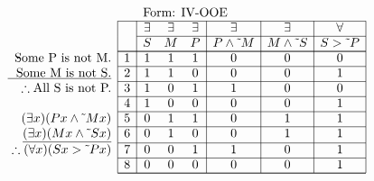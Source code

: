 \documentclass[10pt,legalpaper,landscape,cmtt]{article}
\begin{document}
{\begin{minipage}[t]{3.25in}
	\(
	\begin{array}{r|c|ccc|c|c|c|}
		\multicolumn{2}{c}{}&\multicolumn{6}{l}{\mbox{Form: IV-OOE}} \\ \cline{2-8}
		\hspace{1in}	&	& \exists & \exists & \exists & \exists & \exists & \forall\\ \cline{3-8}
		&	& S & M & P &  P \wedge \tilde~M  &  M \wedge \tilde~S  &  S > \tilde~P \\ \cline{2-8} \cline{2-8}
		\phantom{\therefore}\mbox{Some P is not M.}   & 1 & 1 & 1 & 1 &   0   &   0   &   0  \\ \cline{2-8}
		\underline{\phantom{\therefore}\mbox{Some M is not S.}}   & 2 & 1 & 1 & 0 &   0   &   0   &   1  \\ \cline{2-8}
		\therefore \mbox{All S is not P.}   & 3 & 1 & 0 & 1 &   1   &   0   &   0  \\ \cline{2-8}
		& 4 & 1 & 0 & 0 &   0   &   0   &   1  \\ \cline{2-8}
		(\exists x)(Px \wedge \tilde~Mx)   & 5 & 0 & 1 & 1 &   0   &   1   &   1  \\ \cline{2-8}
		\underline{(\exists x)(Mx \wedge \tilde~Sx)}   & 6 & 0 & 1 & 0 &   0   &   1   &   1  \\ \cline{2-8}
		\therefore(\forall x)(Sx > \tilde~Px)   & 7 & 0 & 0 & 1 &   1   &   0   &   1  \\ \cline{2-8}
		& 8 & 0 & 0 & 0 &   0   &   0   &   1   \\ \cline{2-8}\cline{2-8} 
	\end{array}
	\)
\end{minipage}

}
\end{document}
